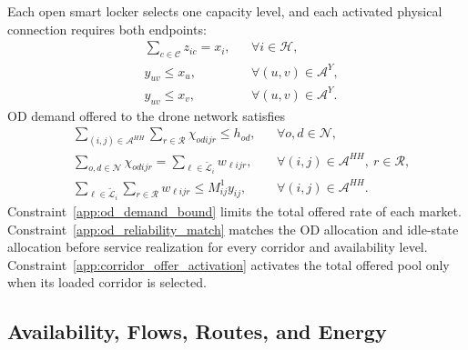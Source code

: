 \documentclass[final,3p,authoryear]{elsarticle}
\begin{document}
Each open smart locker selects one capacity level, and each activated physical connection requires both endpoints:
\begin{align}
&
\sum_{c\in\mathcal C}z_{ic}
=x_i,
&&\forall i\in\mathcal H,
\label{app:capacity_select}
\\
&
y_{uv}
\le x_u,
&&\forall(u,v)\in\mathcal A^{Y},
\label{app:arc_tail}
\\
&
y_{uv}
\le x_v,
&&\forall(u,v)\in\mathcal A^{Y}.
\label{app:arc_head}
\end{align}
OD demand offered to the drone network satisfies
\begin{align}
&
\sum_{(i,j)\in\mathcal A^{HH}}
\sum_{r\in\mathcal R}
\chi_{odijr}
\le h_{od},
&&\forall o,d\in\mathcal N,
\label{app:od_demand_bound}
\\
&
\sum_{o,d\in\mathcal N}\chi_{odijr}
=
\sum_{\ell\in\widetilde{\mathcal L}_{i}}w_{\ell i j r},
&&\forall(i,j)\in\mathcal A^{HH},\ r\in\mathcal R,
\label{app:od_reliability_match}
\\
&
\sum_{\ell\in\widetilde{\mathcal L}_{i}}
\sum_{r\in\mathcal R}
w_{\ell i j r}
\le M^1_{ij}y_{ij},
&&\forall(i,j)\in\mathcal A^{HH}.
\label{app:corridor_offer_activation}
\end{align}
Constraint~\eqref{app:od_demand_bound} limits the total offered rate of each market.
Constraint~\eqref{app:od_reliability_match} matches the OD allocation and idle-state allocation before service realization for every corridor and availability level.
Constraint~\eqref{app:corridor_offer_activation} activates the total offered pool only when its loaded corridor is selected.

\subsection{Availability, Flows, Routes, and Energy}
\end{document}
